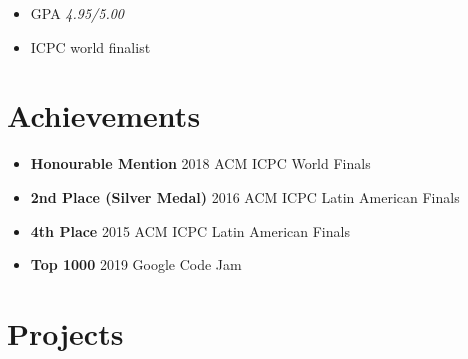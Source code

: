 \documentclass[11pt,a4paper,sans]{moderncv}
\begin{document}
\begin{itemize}[leftmargin=0.6cm, label={\textbullet}]
    \item GPA \emph{4.95/5.00}
    \item ICPC world finalist
\end{itemize}

\section{Achievements}

{\begin{itemize}[label=\textbullet]
\item {\textbf{Honourable Mention} 2018 ACM ICPC World Finals}
\item {\textbf{2nd Place (Silver Medal)} 2016 ACM ICPC Latin 
American Finals}
\item {\textbf{4th Place} 2015 ACM ICPC Latin 
American Finals}
\item {\textbf{Top 1000} 2019 Google Code Jam}
\end{itemize}}

\section{Projects}
\end{document}
